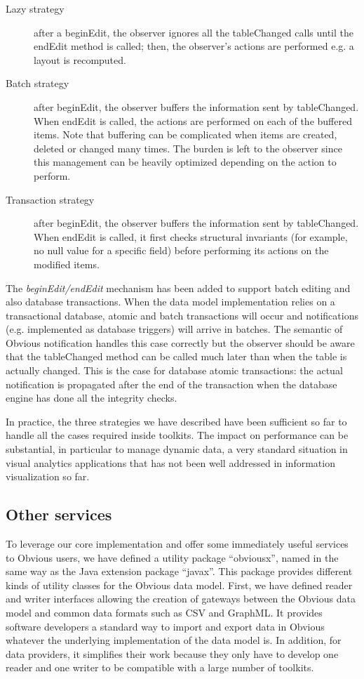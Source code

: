 \begin{description}
\item[Lazy strategy] after a beginEdit, the observer ignores all the
  tableChanged calls until the endEdit method is called; then, the
  observer's actions are performed e.g. a layout is recomputed.

\item[Batch strategy] after beginEdit, the observer buffers the
  information sent by tableChanged.  When endEdit is called, the
  actions are performed on each of the buffered items.  Note that 
  buffering can be complicated when items are created, deleted or
  changed many times.  The burden is left to the observer since this
  management can be heavily optimized depending on the action to
  perform.

\item[Transaction strategy] after beginEdit, the observer buffers the
  information sent by tableChanged.  When endEdit is called, it first
  checks structural invariants (for example, no null value for a
  specific field) before performing its actions on the modified items.
\end{description}

The \emph{beginEdit/endEdit} mechanism has been added to support batch
editing and also database transactions.  When the data model
implementation relies on a transactional database, atomic and batch
transactions will occur and notifications (e.g. implemented as
database triggers) will arrive in batches.  The semantic of Obvious
notification handles this case correctly but the observer should be
aware that the tableChanged method can be called much later than when
the table is actually changed.  This is the case for database atomic
transactions: the actual notification is propagated after the end of
the transaction when the database engine has done all the integrity
checks.

In practice, the three strategies we have described have been
sufficient so far to handle all the cases required inside toolkits.
The impact on performance can be substantial, in particular to manage
dynamic data, a very standard situation in visual analytics
applications that has not been well addressed in information
visualization so far.


\subsection{Other services}

To leverage our core implementation and offer some immediately useful
services to Obvious users, we have defined a utility package
``obviousx'', named in the same way as the Java extension package
``javax''.  This package provides different kinds of utility classes
for the Obvious data model.  First, we have defined reader and writer
interfaces allowing the creation of gateways between the Obvious data
model and common data formats such as CSV and GraphML.  It provides
software developers a standard way to import and export data in
Obvious whatever the underlying implementation of the data model
is.  In addition, for data providers, it simplifies their work because
they only have to develop one reader and one writer to be compatible
with a large number of toolkits.

